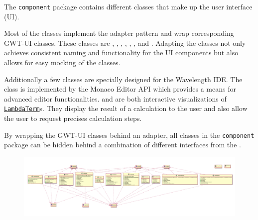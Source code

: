 The \texttt{component} package contains different classes that make up the user interface (UI).

Most of the classes implement the adapter pattern and wrap corresponding GWT-UI classes. 
These classes are \texttt{}, \texttt{}, \texttt{}, 
\texttt{}, \texttt{}, \texttt{}, \texttt{} and \texttt{}.
Adapting the classes not only achieves consistent naming and functionality for the UI components
but also allows for easy mocking of the classes.

Additionally a few classes are specially designed for the Wavelength IDE. The \texttt{} 
class is implemented by the Monaco Editor API which provides a means for advanced editor functionalities. 
\texttt{} and \texttt{} are both interactive visualizations of 
\texttt{\hyperref[type:edu.kit.wavelength.client.model.term.LambdaTerm]{LambdaTerm}}s. They display 
the result of a calculation to the user and also allow the user to request precises calculation steps.

By wrapping the GWT-UI classes behind an adapter, all classes in the \texttt{component} package can
be hidden behind a combination of different interfaces from the \texttt{}.

\begin{figure}[H]
	\centering
	\includegraphics[width=\textwidth]{packageDiagrams/componentsPackage}
\end{figure}
